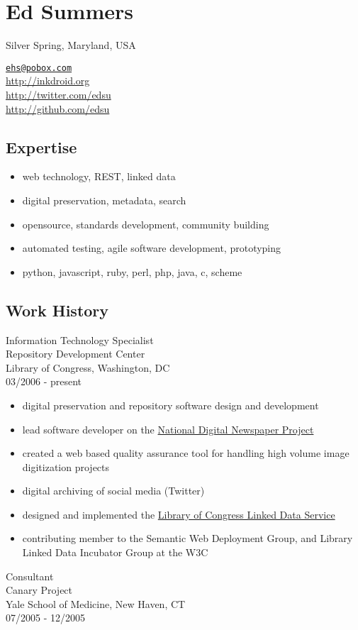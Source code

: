 \section{Ed Summers}

Silver Spring, Maryland, USA

\href{mailto:ehs@pobox.com}{\texttt{ehs@pobox.com}}\\\url{http://inkdroid.org}\\\url{http://twitter.com/edsu}\\\url{http://github.com/edsu}

\subsection{Expertise}

\begin{itemize}
\item
  web technology, REST, linked data\\
\item
  digital preservation, metadata, search\\
\item
  opensource, standards development, community building\\
\item
  automated testing, agile software development, prototyping\\
\item
  python, javascript, ruby, perl, php, java, c, scheme
\end{itemize}
\subsection{Work History}

Information Technology Specialist\\Repository Development
Center\\Library of Congress, Washington, DC\\03/2006 - present

\begin{itemize}
\item
  digital preservation and repository software design and development
\item
  lead software developer on the
  \href{http://chroniclingamerica.loc.gov/}{National Digital Newspaper Project}
\item
  created a web based quality assurance tool for handling high volume
  image digitization projects
\item
  digital archiving of social media (Twitter)
\item
  designed and implemented the
  \href{http://id.loc.gov/}{Library of Congress Linked Data Service}
\item
  contributing member to the Semantic Web Deployment Group, and
  Library Linked Data Incubator Group at the W3C
\end{itemize}
Consultant\\Canary Project\\Yale School of Medicine, New Haven,
CT\\07/2005 - 12/2005

